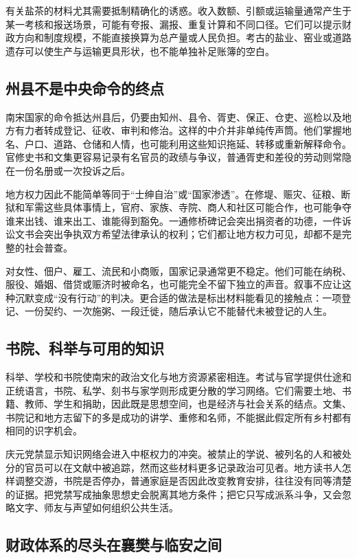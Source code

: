 有关盐茶的材料尤其需要抵制精确化的诱惑。收入数额、引额或运输量通常产生于某一考核和报送场景，可能有夸报、漏报、重复计算和不同口径。它们可以提示财政方向和制度规模，不能直接换算为总产量或人民负担。考古的盐业、窑业或道路遗存可以使生产与运输更具形状，也不能单独补足账簿的空白。

\subsection{州县不是中央命令的终点}

南宋国家的命令抵达州县后，仍要由知州、县令、胥吏、保正、仓吏、巡检以及地方有力者转成登记、征收、审判和修治。这样的中介并非单纯传声筒。他们掌握地名、户口、道路、仓储和人情，也可能利用这些知识拖延、转移或重新解释命令。官修史书和文集更容易记录有名官员的政绩与争议，普通胥吏和差役的劳动则常隐在一份名册或一次投诉之后。

地方权力因此不能简单等同于“士绅自治”或“国家渗透”。在修堤、赈灾、征粮、断狱和军需这些具体事情上，官府、家族、寺院、商人和社区可能合作，也可能争夺谁来出钱、谁来出工、谁能得到豁免。一通修桥碑记会突出捐资者的功德，一件诉讼文书会突出争执双方希望法律承认的权利；它们都让地方权力可见，却都不是完整的社会普查。

对女性、佃户、雇工、流民和小商贩，国家记录通常更不稳定。他们可能在纳税、服役、婚姻、借贷或赈济时被命名，也可能完全不留下独立的声音。叙事不应让这种沉默变成“没有行动”的判决。更合适的做法是标出材料能看见的接触点：一项登记、一份契约、一次施粥、一段迁徙，随后承认它不能替代未被登记的人生。

\subsection{书院、科举与可用的知识}

科举、学校和书院使南宋的政治文化与地方资源紧密相连。考试与官学提供仕途和正统语言，书院、私学、刻书与家学则形成更分散的学习网络。它们需要土地、书籍、教师、学生和捐助，因此既是思想空间，也是经济与社会关系的结点。文集、书院记和地方志留下的多是成功的讲学、重修和名师，不能据此假定所有乡村都有相同的识字机会。

庆元党禁显示知识网络会进入中枢权力的冲突。被禁止的学说、被列名的人和被处分的官员可以在文献中被追踪，然而这些材料更多记录政治可见者。地方读书人怎样调整交游，书院是否停办，普通家庭是否因此改变教育安排，往往没有同等清楚的证据。把党禁写成抽象思想史会脱离其地方条件；把它只写成派系斗争，又会忽略文字、师友与声望如何组织公共生活。

\subsection{财政体系的尽头在襄樊与临安之间}

